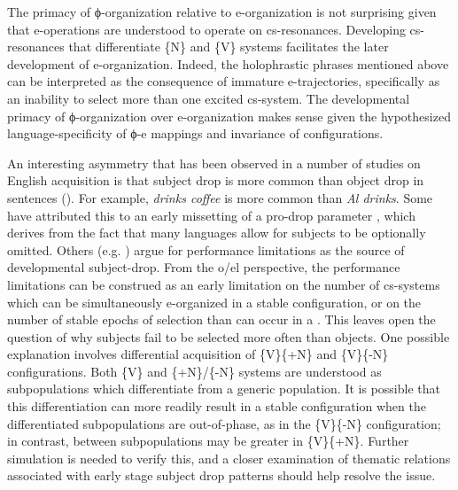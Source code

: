 The primacy of ϕ-organization relative to e-organization is not surprising given that e-operations are understood to operate on cs-resonances. Developing cs-resonances that differentiate \{N\} and \{V\} systems facilitates the later development of e-organization. Indeed, the holophrastic phrases mentioned above can be interpreted as the consequence of immature e-trajectories, specifically as an inability to select more than one excited cs-system. The developmental primacy of ϕ{}-organization over e-organization makes sense given the hypothesized language-specificity of ϕ{}-e mappings and invariance of  configurations.

  An interesting asymmetry that has been observed in a number of studies on English acquisition is that subject drop is more common than object drop in  sentences (\citealt{PBloom1990,Valian1991}). For example, \textit{drinks coffee} is more common than \textit{Al drinks}. Some have attributed this to an early missetting of a pro-drop parameter \citep{Hyams2012}, which derives from the fact that many languages allow for subjects to be optionally omitted. Others (e.g. \citealt{PBloom1990}) argue for performance limitations as the source of developmental subject-drop. From the o/el perspective, the performance limitations can be construed as an early limitation on the number of cs-systems which can be simultaneously e-organized in a stable configuration, or on the number of stable epochs of selection than can occur in a . This leaves open the question of why  subjects fail to be selected more often than objects. One possible explanation involves differential acquisition of \{V\}\{+N\} and \{V\}\{-N\} configurations. Both \{V\} and \{+N\}/\{-N\} systems are understood as subpopulations which differentiate from a generic  population. It is possible that this differentiation can more readily result in a stable configuration when the differentiated subpopulations are out-of-phase, as in the \{V\}\{-N\} configuration; in contrast,  between subpopulations may be greater in \{V\}\{+N\}. Further simulation is needed to verify this, and a closer examination of thematic relations associated with early stage subject drop patterns should help resolve the issue.

